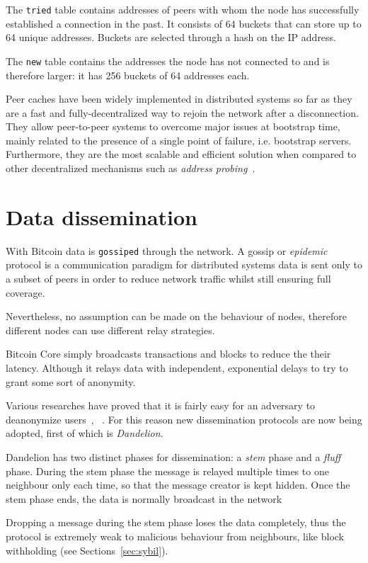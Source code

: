 The \texttt{tried} table contains addresses of peers with whom the node has successfully established a connection in the past. It consists of 64 buckets that can store up to 64 unique addresses. Buckets are selected through a hash on the IP address.

The \texttt{new} table contains the addresses the node has not connected to and is therefore larger: it has 256 buckets of 64 addresses each.

Peer caches have been widely implemented in distributed systems so far as they are a fast and fully-decentralized way to rejoin the network after a disconnection. They allow peer-to-peer systems to overcome major issues at bootstrap time, mainly related to the presence of a single point of failure, i.e. bootstrap servers. Furthermore, they are the most scalable and efficient solution when compared to other decentralized mechanisms such as \textit{address probing}~\cite{decentrbootstrapp2p}.

\section{Data dissemination}\label{sec:dissem}
With Bitcoin data is \texttt{gossiped} through the network. A gossip or \textit{epidemic} protocol is a communication paradigm for distributed systems data is sent only to a subset of peers in order to reduce network traffic whilst still ensuring full coverage.

Nevertheless, no assumption can be made on the behaviour of nodes, therefore different nodes can use different relay strategies.

Bitcoin Core simply broadcasts transactions and blocks to reduce the their latency. Although it relays data with independent, exponential delays to try to grant some sort of anonymity.

Various researches have proved that it is fairly easy for an adversary to deanonymize users~\cite{biryukov2014deanonymisation},~\cite{koshy2014deanon} . For this reason new dissemination protocols are now being adopted, first of which is \textit{Dandelion}. 

Dandelion has two distinct phases for dissemination: a \textit{stem} phase and a \textit{fluff} phase. During the stem phase the message is relayed multiple times to one neighbour only each time, so that the message creator is kept hidden. Once the stem phase ends, the data is normally broadcast in the network~\cite{dand}

Dropping a message during the stem phase loses the data completely, thus the protocol is extremely weak to malicious behaviour from neighbours, like block withholding (see Sections~\ref{sec:sybil}).

